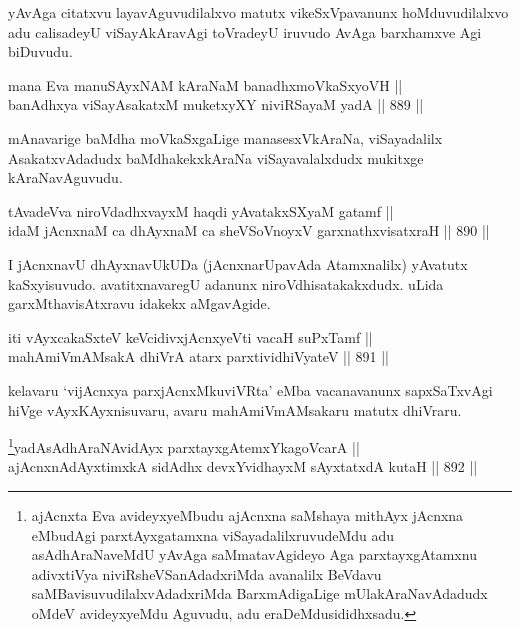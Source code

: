 \begin{artha}
yAvAga citatxvu layavAguvudilalxvo matutx vikeSxVpavanunx hoMduvudilalxvo adu calisadeyU viSayAkAravAgi toVradeyU iruvudo AvAga barxhamxve Agi biDuvudu.
\end{artha}


\begin{shl}
mana Eva manuSAyxNAM kAraNaM banadhxmoVkaSxyoVH || \\
banAdhxya viSayAsakatxM muketxyXY niviRSayaM yadA \hfill || 889 ||  
\end{shl}

\begin{artha}
mAnavarige baMdha moVkaSxgaLige manasesxVkAraNa, viSayadalilx AsakatxvAdadudx baMdhakekxkAraNa viSayavalalxdudx mukitxge kAraNavAguvudu.
\end{artha}


\begin{shl}
tAvadeVva niroVdadhxvayxM haqdi yAvatakxSXyaM gatamf || \\
idaM jAcnxnaM ca dhAyxnaM ca sheVSoVnoyxV garxnathxvisatxraH \hfill || 890 ||  
\end{shl}

\begin{artha}
I jAcnxnavU dhAyxnavUkUDa (jAcnxnarUpavAda Atamxnalilx) yAvatutx kaSxyisuvudo. avatitxnavaregU adanunx niroVdhisatakakxdudx. uLida garxMthavisAtxravu idakekx aMgavAgide.
\end{artha}


\begin{shl}
iti vAyxcakaSxteV keVcidivxjAcnxyeVti vacaH suPxTamf || \\
mahAmiVmAMsakA dhiVrA atarx parxtividhiVyateV \hfill || 891 ||  
\end{shl}

\begin{artha}
kelavaru `vijAcnxya parxjAcnxMkuviVRta' eMba vacanavanunx sapxSaTxvAgi hiVge vAyxKAyxnisuvaru, avaru mahAmiVmAMsakaru matutx dhiVraru.
\end{artha}



\begin{shl}
\footnote{ajAcnxta Eva avideyxyeMbudu ajAcnxna saMshaya mithAyx jAcnxna eMbudAgi parxtAyxgatamxna viSayadalilxruvudeMdu adu asAdhAraNaveMdU yAvAga saMmatavAgideyo Aga parxtayxgAtamxnu adivxtiVya niviRsheVSanAdadxriMda avanalilx BeVdavu saMBavisuvudilalxvAdadxriMda BarxmAdigaLige mUlakAraNavAdadudx oMdeV avideyxyeMdu Aguvudu, adu eraDeMdusididhxsadu.}yadA\s sAdhAraNA\s vidAyx parxtayxgAtemxYkagoVcarA || \\
ajAcnxnAdAyxtimxkA sidAdhx devxYvidhayxM sAyxtatxdA kutaH \hfill || 892 ||  
\end{shl}


